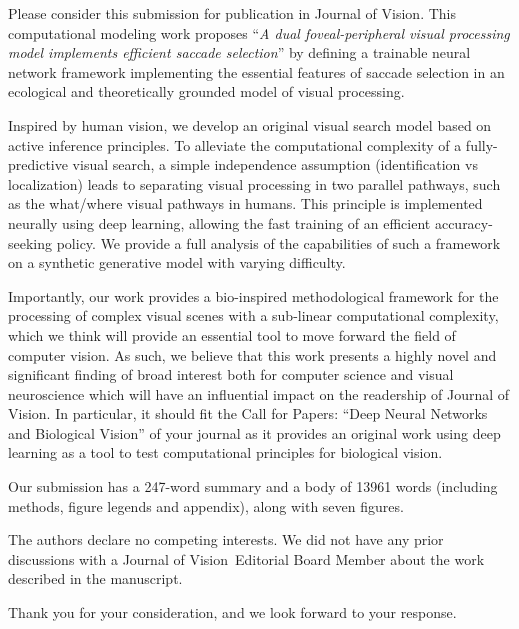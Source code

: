 \documentclass[stdletter,8pt,dateno]{newlfm}%
\newcommand{\Title}{A dual foveal-peripheral visual processing model implements efficient saccade selection}
\newcommand{\Journal}{Journal of Vision}%
\begin{document}
\begin{newlfm}
%
Please consider this submission for publication in \Journal . This computational modeling work proposes ``\emph{\Title}'' by defining a trainable neural network framework implementing the essential features of saccade selection in an ecological and theoretically grounded model of visual processing.

Inspired by human vision, we develop an original visual search model based on active inference principles. To alleviate the computational complexity of a fully-predictive visual search, a simple independence assumption (identification vs localization) leads to separating  visual processing in two parallel pathways, such as the what/where visual pathways in humans. This principle is implemented neurally using deep learning, allowing the fast training of an efficient accuracy-seeking policy. We provide a full analysis of the capabilities of such a framework on a synthetic generative model with varying difficulty.

Importantly, our work provides a bio-inspired methodological framework for the processing of complex visual scenes with a sub-linear computational complexity, which we think will provide an essential tool to move forward the field of computer vision.
As such, we believe that this work presents a highly novel and significant finding of broad interest both for computer science and visual neuroscience which will have an influential impact on the readership of \Journal . In particular, it should fit the Call for Papers: ``Deep Neural Networks and Biological Vision'' of your journal as it provides an original work using deep learning as a tool to test computational principles for biological vision.

Our submission has a 247-word summary and a body of 13961 words
(including methods, figure legends and appendix), along with seven figures.

The authors declare no competing interests.
We did not have any prior discussions with
a \Journal\ Editorial Board Member
about the work described in the manuscript.

Thank you for your consideration, and we look forward to your response.

\end{newlfm}
\end{document}
